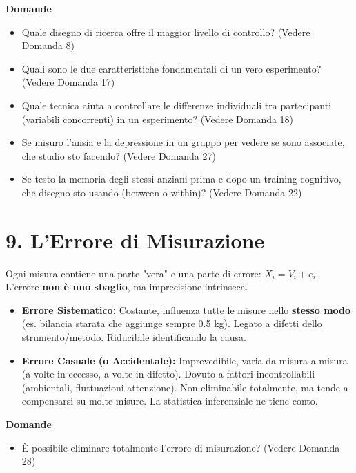 \documentclass[12pt, a4paper]{article}
\newenvironment{reflectionbox}{%
    \begin{framed}\par\medskip\noindent
    \textbf{\color{boxtitlecolor}Domande} \par
    \begin{itemize}[leftmargin=*, label=$\blacktriangleright$]
}{%
    \end{itemize}\par\medskip
    \end{framed}
}
\begin{document}
\begin{reflectionbox}
    \item Quale disegno di ricerca offre il maggior livello di controllo? (Vedere Domanda 8)
    \item Quali sono le due caratteristiche fondamentali di un vero esperimento? (Vedere Domanda 17)
    \item Quale tecnica aiuta a controllare le differenze individuali tra partecipanti (variabili concorrenti) in un esperimento? (Vedere Domanda 18)
    \item Se misuro l'ansia e la depressione in un gruppo per vedere se sono associate, che studio sto facendo? (Vedere Domanda 27)
    \item Se testo la memoria degli stessi anziani prima e dopo un training cognitivo, che disegno sto usando (between o within)? (Vedere Domanda 22)
\end{reflectionbox}

\section*{9. L'Errore di Misurazione}
Ogni misura contiene una parte "vera" e una parte di errore: $X_i = V_i + e_i$. L'errore \textbf{non è uno sbaglio}, ma imprecisione intrinseca.
\begin{itemize}
    \item \textbf{Errore Sistematico:} Costante, influenza tutte le misure nello \textbf{stesso modo} (es. bilancia starata che aggiunge sempre 0.5 kg). Legato a difetti dello strumento/metodo. Riducibile identificando la causa.
    \item \textbf{Errore Casuale (o Accidentale):} Imprevedibile, varia da misura a misura (a volte in eccesso, a volte in difetto). Dovuto a fattori incontrollabili (ambientali, fluttuazioni attenzione). Non eliminabile totalmente, ma tende a compensarsi su molte misure. La statistica inferenziale ne tiene conto.
\end{itemize}

\begin{reflectionbox}
    \item È possibile eliminare totalmente l'errore di misurazione? (Vedere Domanda 28)
\end{reflectionbox}
\end{document}
